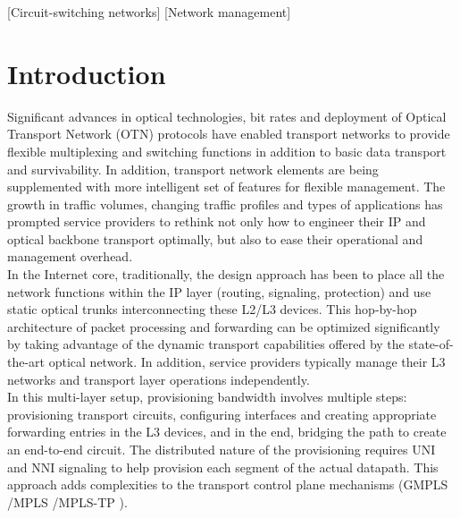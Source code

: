 \documentclass{sig-alternate-2013}
\begin{document}
[Circuit-switching networks]
[Network management] 



\vfill\eject
	
	\section{Introduction}
	Significant advances in optical technologies, bit rates and deployment of Optical Transport Network (OTN) \cite{otn} protocols have enabled transport networks to provide flexible 
	multiplexing and switching functions in addition to basic data transport and survivability. In addition, transport network elements are  being supplemented with more intelligent 
	set of features for flexible management. The growth in traffic volumes, changing traffic profiles and types of applications has prompted service providers to rethink not only how to
	engineer their IP and optical backbone transport optimally, but also to ease their operational and management overhead.\\
	
	In the Internet core, traditionally, the design approach has been to place all the network functions within the IP layer
	(routing, signaling, protection) and use static optical trunks interconnecting these L2/L3 devices. This hop-by-hop architecture of packet processing
	and forwarding can be optimized significantly by taking advantage of the dynamic transport capabilities offered by the state-of-the-art optical network. 
	In addition, service providers typically manage their L3 networks and transport layer operations independently. \\
	
	In this multi-layer setup, provisioning bandwidth involves multiple steps: provisioning transport circuits, configuring interfaces and creating appropriate forwarding entries in the L3 devices, and in the end, bridging the 	path to create an end-to-end circuit. The distributed nature of the provisioning requires UNI and NNI signaling to help provision each segment of the actual datapath. This approach adds complexities to the transport 	control plane mechanisms (GMPLS \cite{gmpls}/MPLS \cite{mpls}/MPLS-TP \cite{mpls-tp}). \\
\end{document}
